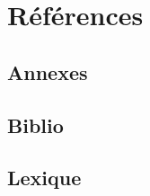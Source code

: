\documentclass[11pt,french,a4paper]{report}
\begin{document}
\chapter{Références}
    \section{Annexes}
    \section{Biblio}
    \section{Lexique}
\end{document}
